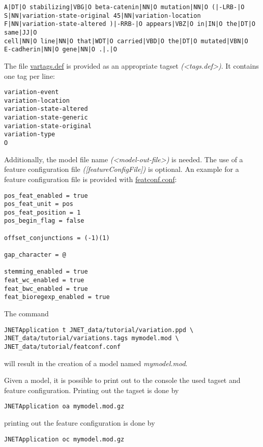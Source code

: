 \documentclass[11pt,a4paper,halfparskip]{scrartcl}
\begin{document}
\begin{verbatim}
A|DT|O stabilizing|VBG|O beta-catenin|NN|O mutation|NN|O (|-LRB-|O
S|NN|variation-state-original 45|NN|variation-location
F|NN|variation-state-altered )|-RRB-|O appears|VBZ|O in|IN|O the|DT|O same|JJ|O
cell|NN|O line|NN|O that|WDT|O carried|VBD|O the|DT|O mutated|VBN|O
E-cadherin|NN|O gene|NN|O .|.|O
\end{verbatim}

The file \url{vartags.def} is provided as an appropriate tagset
\textit{(<tags.def>)}. It contains one tag per line:

\begin{verbatim}
variation-event
variation-location
variation-state-altered
variation-state-generic
variation-state-original
variation-type
O
\end{verbatim}

Additionally, the model file name \textit{(<model-out-file>)} is needed. The
use of a feature configuration file \textit{([featureConfigFile])} is
optional. An example for a feature configuration file is provided with
\url{featconf.conf}:

\begin{verbatim}
pos_feat_enabled = true
pos_feat_unit = pos
pos_feat_position = 1
pos_begin_flag = false

offset_conjunctions = (-1)(1)

gap_character = @

stemming_enabled = true
feat_wc_enabled = true
feat_bwc_enabled = true
feat_bioregexp_enabled = true
\end{verbatim}

The command
\begin{verbatim}
JNETApplication t JNET_data/tutorial/variation.ppd \
JNET_data/tutorial/variations.tags mymodel.mod \
JNET_data/tutorial/featconf.conf
\end{verbatim}
will result in the creation of a model named \textit{mymodel.mod}.

Given a model, it is possible to print out to the console the used
tagset and feature configuration. Printing out the tagset is done by

\begin{verbatim}
JNETApplication oa mymodel.mod.gz
\end{verbatim}

printing out the feature configuration is done by

\begin{verbatim}
JNETApplication oc mymodel.mod.gz
\end{verbatim}
\end{document}
